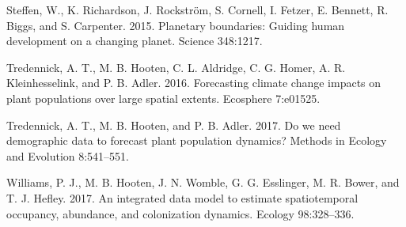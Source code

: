 \documentclass[12pt,]{article}
\begin{document}
\leavevmode\hypertarget{ref-Steffen2015}{}%
Steffen, W., K. Richardson, J. Rockström, S. Cornell, I. Fetzer, E.
Bennett, R. Biggs, and S. Carpenter. 2015. Planetary boundaries: Guiding
human development on a changing planet. Science 348:1217.

\leavevmode\hypertarget{ref-Tredennick2016Ecos}{}%
Tredennick, A. T., M. B. Hooten, C. L. Aldridge, C. G. Homer, A. R.
Kleinhesselink, and P. B. Adler. 2016. Forecasting climate change
impacts on plant populations over large spatial extents. Ecosphere
7:e01525.

\leavevmode\hypertarget{ref-Tredennick2017a}{}%
Tredennick, A. T., M. B. Hooten, and P. B. Adler. 2017. Do we need
demographic data to forecast plant population dynamics? Methods in
Ecology and Evolution 8:541--551.

\leavevmode\hypertarget{ref-Williams2017a}{}%
Williams, P. J., M. B. Hooten, J. N. Womble, G. G. Esslinger, M. R.
Bower, and T. J. Hefley. 2017. An integrated data model to estimate
spatiotemporal occupancy, abundance, and colonization dynamics. Ecology
98:328--336.
\end{document}
